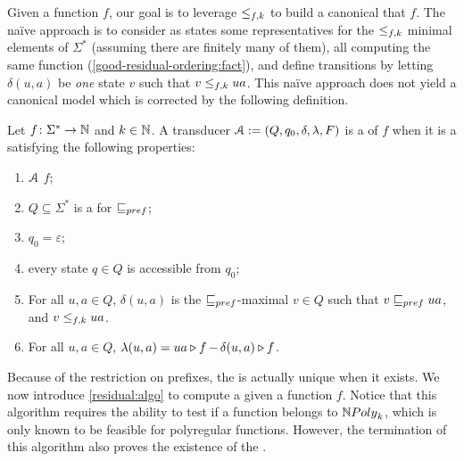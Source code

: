Given a function $f$, our goal is to leverage $\resleq{f}{k}$ to build a
canonical  that  $f$. The naïve
approach is to consider as states some representatives for the $\resleq{f}{k}$
minimal elements of $\Sigma^*$ (assuming there are finitely many of them), all
computing the same function (\cref{good-residual-ordering:fact}), and define
transitions by letting $\delta(u, a)$ be \emph{one} state $v$ such that $v
\resleq{f}{k} ua$. This naïve approach does not yield a canonical model which
is corrected by the following definition.

\begin{definition}
    \label{residual-transducer:def}
    Let $f \colon \Sigma^* \to \Nat$ and $k \in \Nat$.
    A transducer $\aTransd \defined (Q, q_0, \delta, \lambda, F)$
    is a 
    of $f$ 
    when
    it is a 
    satisfying the following properties:
    \begin{enumerate}
        \item $\aTransd$  $f$;
        \item $Q \subseteq \Sigma^*$ is a 
            for $\prefleq$;
        \item $q_0 = \varepsilon$;
        \item every state $q \in Q$ is accessible from $q_0$;
        \item For all $u, a \in Q$,
            $\delta(u,a)$ is the $\prefleq$-maximal $v \in Q$
            such that $v \prefleq ua$, and $v \resleq{f}{k} ua$.
        \item For all $u,a \in Q$,
            $\lambda(u,a) = \app{f}{ua} - \app{f}{\delta(u,a)}$.
    \end{enumerate}
\end{definition}


Because of the restriction on prefixes, the 
is actually unique when it exists.
We now introduce \cref{residual:algo} to compute a 
given a function $f$. Notice that this algorithm requires the ability to test
if a function belongs to $\NPoly[k]$, which is only known to be feasible for
 polyregular functions. However, the termination of this
algorithm also proves the existence of the .


